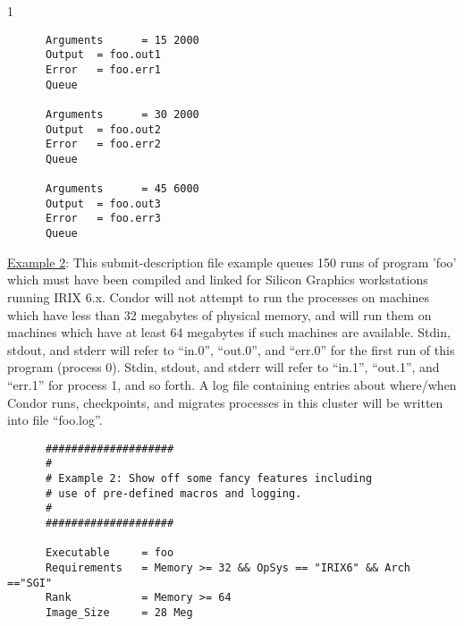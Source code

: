 \begin{ManPage}{\label{man-condor-submit}}{1}
\begin{verbatim}
      Arguments      = 15 2000                                               
      Output  = foo.out1                                                     
      Error   = foo.err1
      Queue                                                                  
                                                                         
      Arguments      = 30 2000                                               
      Output  = foo.out2                                                     
      Error   = foo.err2
      Queue                                                                  
                                                                         
      Arguments      = 45 6000                                               
      Output  = foo.out3                                                     
      Error   = foo.err3
      Queue                   
\end{verbatim}

\underline{Example 2}: This submit-description file example queues 150
runs of program 'foo' which must have been compiled and linked for
Silicon Graphics workstations running IRIX 6.x. Condor will not attempt
to run the processes on machines which have less than 32 megabytes of
physical memory, and will run them on machines which have at least 64
megabytes if such machines are available. Stdin, stdout, and stderr will
refer to ``in.0'', ``out.0'', and ``err.0'' for the first run of this program
(process 0). Stdin, stdout, and stderr will refer to ``in.1'', ``out.1'',
and ``err.1'' for process 1, and so forth. A log file containing entries
about where/when Condor runs, checkpoints, and migrates processes in this
cluster will be written into file ``foo.log''.

\begin{verbatim}
      ####################                                                    
      #                                                                       
      # Example 2: Show off some fancy features including                            
      # use of pre-defined macros and logging.                                
      #                                                                       
      ####################                                                    
                                                                          
      Executable     = foo                                                    
      Requirements   = Memory >= 32 && OpSys == "IRIX6" && Arch =="SGI"     
      Rank           = Memory >= 64
      Image_Size     = 28 Meg                                                 
                                                                          

\end{verbatim}
\end{ManPage}
